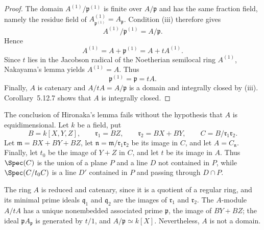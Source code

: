 \begin{proof}
The domain $A^{(1)}/\mathfrak p^{(1)}$ is finite over
$A/\mathfrak p$ and has the same fraction field, namely the
residue field of
$A^{(1)}_{\mathfrak p^{(1)}}=A_{\mathfrak p}$.  Condition
{\rm(iii)} therefore gives
\[
  A^{(1)}/\mathfrak p^{(1)}=A/\mathfrak p.
\]
Hence
\[
  A^{(1)}=A+\mathfrak p^{(1)}=A+tA^{(1)}.
\]
Since $t$ lies in the Jacobson radical of the Noetherian
semilocal ring $A^{(1)}$, Nakayama's lemma yields
$A^{(1)}=A$.  Thus
\[
  \mathfrak p^{(1)}=\mathfrak p=tA.
\]
Finally, $A$ is catenary and
$A/tA=A/\mathfrak p$ is a domain and integrally closed by
{\rm(iii)}.  Corollary~5.12.7 shows that $A$ is integrally
closed.
\end{proof}

\begin{remark}[5.12.9]
\label{IV.5.12.9}
The conclusion of Hironaka's lemma fails without the hypothesis
that $A$ is equidimensional.  Let $k$ be a field, put
\[
  B=k[X,Y,Z],\qquad
  \mathfrak r_1=BZ,\qquad
  \mathfrak r_2=BX+BY,\qquad
  C=B/\mathfrak r_1\mathfrak r_2.
\]
Let $\mathfrak m=BX+BY+BZ$, let
$\mathfrak n=\mathfrak m/\mathfrak r_1\mathfrak r_2$ be its
image in $C$, and let $A=C_{\mathfrak n}$.  Finally, let $t_0$
be the image of $Y+Z$ in $C$, and let $t$ be its image in $A$.
Thus $\Spec(C)$ is the union of a plane $P$ and a line $D$ not
contained in $P$, while $\Spec(C/t_0C)$ is a line $D'$ contained
in $P$ and passing through $D\cap P$.

The ring $A$ is reduced and catenary, since it is a quotient of a
regular ring, and its minimal prime ideals $\mathfrak q_1$ and
$\mathfrak q_2$ are the images of $\mathfrak r_1$ and
$\mathfrak r_2$.  The $A$-module $A/tA$ has a unique
nonembedded associated prime $\mathfrak p$, the image of
$BY+BZ$; the ideal $\mathfrak pA_{\mathfrak p}$ is generated by
$t/1$, and $A/\mathfrak p\simeq k[X]$.  Nevertheless, $A$ is
not a domain.
\end{remark}

